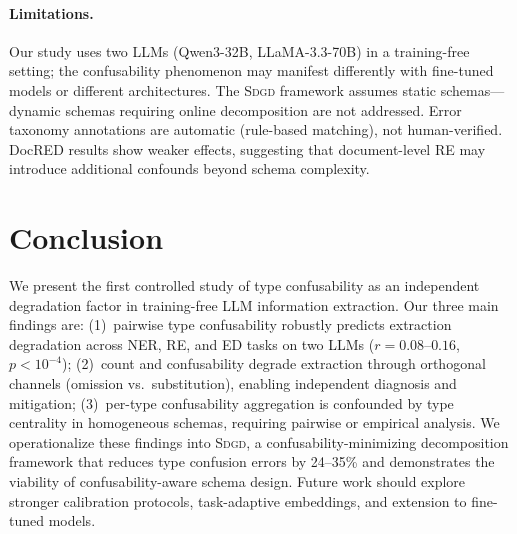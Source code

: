 \documentclass[11pt,a4paper]{article}
\newcommand{\sdgd}{\textsc{Sdgd}}
\begin{document}
\paragraph{Limitations.}
Our study uses two LLMs (Qwen3-32B, LLaMA-3.3-70B) in a training-free setting; the confusability phenomenon may manifest differently with fine-tuned models or different architectures.
The \sdgd{} framework assumes static schemas---dynamic schemas requiring online decomposition are not addressed.
Error taxonomy annotations are automatic (rule-based matching), not human-verified.
DocRED results show weaker effects, suggesting that document-level RE may introduce additional confounds beyond schema complexity.

\section{Conclusion}
\label{sec:conclusion}

We present the first controlled study of type confusability as an independent degradation factor in training-free LLM information extraction.
Our three main findings are:
(1)~pairwise type confusability robustly predicts extraction degradation across NER, RE, and ED tasks on two LLMs ($r{=}0.08$--$0.16$, $p{<}10^{-4}$);
(2)~count and confusability degrade extraction through orthogonal channels (omission vs.\ substitution), enabling independent diagnosis and mitigation;
(3)~per-type confusability aggregation is confounded by type centrality in homogeneous schemas, requiring pairwise or empirical analysis.
We operationalize these findings into \sdgd{}, a confusability-minimizing decomposition framework that reduces type confusion errors by 24--35\% and demonstrates the viability of confusability-aware schema design.
Future work should explore stronger calibration protocols, task-adaptive embeddings, and extension to fine-tuned models.
\end{document}
